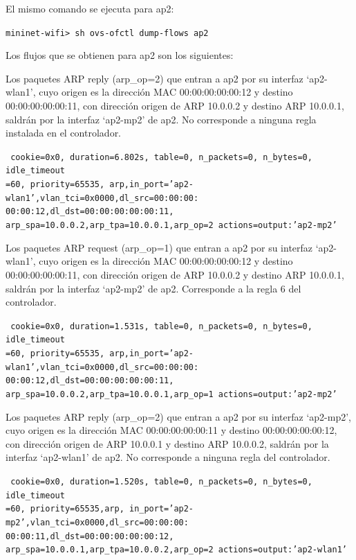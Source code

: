 \documentclass[a4paper,12pt,twoside,spanish]{book}
\begin{document}
\hspace{1cm}

El mismo comando se ejecuta para ap2:\par 

\begin{center}
	\texttt{mininet-wifi> sh ovs-ofctl dump-flows ap2}
\end{center}

Los flujos que se obtienen para ap2 son los siguientes:\par

Los paquetes ARP reply (arp\_op=2) que entran a ap2 por su interfaz ‘ap2-wlan1’, cuyo origen es la dirección MAC 00:00:00:00:00:12 y destino 00:00:00:00:00:11, con dirección origen de ARP 10.0.0.2 y destino ARP 10.0.0.1, saldrán por la interfaz ‘ap2-mp2’ de ap2. No corresponde a ninguna regla instalada en el controlador.\par 

\noindent\texttt{
	cookie=0x0, duration=6.802s, table=0, n\_packets=0, n\_bytes=0, idle\_timeout\\
	=60, priority=65535,
	arp,in\_port='ap2-wlan1',vlan\_tci=0x0000,dl\_src=00:00:00:\\
	00:00:12,dl\_dst=00:00:00:00:00:11,
	arp\_spa=10.0.0.2,arp\_tpa=10.0.0.1,arp\_op=2 actions=output:'ap2-mp2'
}

Los paquetes ARP request (arp\_op=1) que entran a ap2 por su interfaz ‘ap2-wlan1’, cuyo origen es la dirección MAC 00:00:00:00:00:12 y destino 00:00:00:00:00:11, con dirección origen de ARP 10.0.0.2 y destino ARP 10.0.0.1, saldrán por la interfaz ‘ap2-mp2’ de ap2. Corresponde a la regla 6 del controlador.\par 

\noindent\texttt{
	cookie=0x0, duration=1.531s, table=0, n\_packets=0, n\_bytes=0, idle\_timeout\\
	=60, priority=65535,
	arp,in\_port='ap2-wlan1',vlan\_tci=0x0000,dl\_src=00:00:00:\\
	00:00:12,dl\_dst=00:00:00:00:00:11,
	arp\_spa=10.0.0.2,arp\_tpa=10.0.0.1,arp\_op=1 actions=output:'ap2-mp2'
}

Los paquetes ARP reply (arp\_op=2) que entran a ap2 por su interfaz ‘ap2-mp2’, cuyo origen es la dirección MAC 00:00:00:00:00:11 y destino 00:00:00:00:00:12, con dirección origen de ARP 10.0.0.1 y destino ARP 10.0.0.2, saldrán por la interfaz ‘ap2-wlan1’ de ap2. No corresponde a ninguna regla del controlador.\par 

\noindent\texttt{
	cookie=0x0, duration=1.520s, table=0, n\_packets=0, n\_bytes=0, idle\_timeout\\
	=60, priority=65535,arp,
	in\_port='ap2-mp2',vlan\_tci=0x0000,dl\_src=00:00:00:\\
	00:00:11,dl\_dst=00:00:00:00:00:12,
	arp\_spa=10.0.0.1,arp\_tpa=10.0.0.2,arp\_op=2 actions=output:'ap2-wlan1'
}
\end{document}
